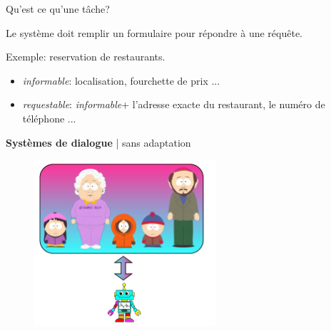 \documentclass[french,handout]{beamer}
\begin{document}
    \begin{frame}{Qu'est ce qu'une tâche?}

        Le système doit remplir un formulaire pour répondre à une réquête.\\

        \begin{block}{Exemple: reservation de restaurants.}
            \begin{itemize}
                \item \textit{informable}: localisation, fourchette de prix ...
                \item \textit{requestable}: \textit{informable}+ l'adresse exacte du restaurant, le numéro de téléphone ...
            \end{itemize}
        \end{block}

    \end{frame}

    \begin{frame}{\textbf{Systèmes de dialogue} | sans adaptation}
        \begin{figure}
            \begin{center}
                \includegraphics[width=0.6\textwidth]{img/adap0.pdf}
            \end{center}
        \end{figure}
    \end{frame}
\end{document}
